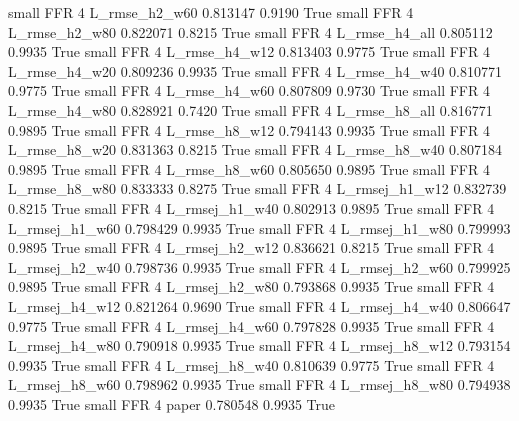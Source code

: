      small      FFR                 4  L_rmse_h2_w60   0.813147      0.9190    True
     small      FFR                 4  L_rmse_h2_w80   0.822071      0.8215    True
     small      FFR                 4  L_rmse_h4_all   0.805112      0.9935    True
     small      FFR                 4  L_rmse_h4_w12   0.813403      0.9775    True
     small      FFR                 4  L_rmse_h4_w20   0.809236      0.9935    True
     small      FFR                 4  L_rmse_h4_w40   0.810771      0.9775    True
     small      FFR                 4  L_rmse_h4_w60   0.807809      0.9730    True
     small      FFR                 4  L_rmse_h4_w80   0.828921      0.7420    True
     small      FFR                 4  L_rmse_h8_all   0.816771      0.9895    True
     small      FFR                 4  L_rmse_h8_w12   0.794143      0.9935    True
     small      FFR                 4  L_rmse_h8_w20   0.831363      0.8215    True
     small      FFR                 4  L_rmse_h8_w40   0.807184      0.9895    True
     small      FFR                 4  L_rmse_h8_w60   0.805650      0.9895    True
     small      FFR                 4  L_rmse_h8_w80   0.833333      0.8275    True
     small      FFR                 4 L_rmsej_h1_w12   0.832739      0.8215    True
     small      FFR                 4 L_rmsej_h1_w40   0.802913      0.9895    True
     small      FFR                 4 L_rmsej_h1_w60   0.798429      0.9935    True
     small      FFR                 4 L_rmsej_h1_w80   0.799993      0.9895    True
     small      FFR                 4 L_rmsej_h2_w12   0.836621      0.8215    True
     small      FFR                 4 L_rmsej_h2_w40   0.798736      0.9935    True
     small      FFR                 4 L_rmsej_h2_w60   0.799925      0.9895    True
     small      FFR                 4 L_rmsej_h2_w80   0.793868      0.9935    True
     small      FFR                 4 L_rmsej_h4_w12   0.821264      0.9690    True
     small      FFR                 4 L_rmsej_h4_w40   0.806647      0.9775    True
     small      FFR                 4 L_rmsej_h4_w60   0.797828      0.9935    True
     small      FFR                 4 L_rmsej_h4_w80   0.790918      0.9935    True
     small      FFR                 4 L_rmsej_h8_w12   0.793154      0.9935    True
     small      FFR                 4 L_rmsej_h8_w40   0.810639      0.9775    True
     small      FFR                 4 L_rmsej_h8_w60   0.798962      0.9935    True
     small      FFR                 4 L_rmsej_h8_w80   0.794938      0.9935    True
     small      FFR                 4          paper   0.780548      0.9935    True
